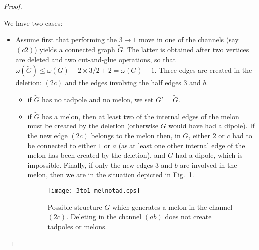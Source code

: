 \documentclass[10pt]{article}
\theoremstyle{plain}
\theoremstyle{definition}
\begin{document}
\begin{proof}
\begin{description}
We have two cases:
\begin{itemize}
\item Assume first that performing the $3\to 1$ move in one of the channels (say $(c2)$) yields a connected graph $\tilde{G}$. The latter is obtained after two vertices are deleted and two cut-and-glue operations,
so that $\omega(\tilde{G}) \leq \omega(G) - 2\times 3/2 + 2 = \omega(G) - 1$. Three edges are created in the deletion: $(2c)$ and the edges involving the half edges $3$ and $b$.
\begin{itemize}
\item if $\tilde{G}$ has no tadpole and no melon, we set $G' = \tilde{G}$.
\item if $\tilde{G}$ has a melon, then at least two of the internal edges of the melon must be created by the deletion (otherwise $G$ would have had a dipole). If the new edge $(2c)$ belongs to the melon then, in $G$,
either $2$ or $c$ had to be connected to either $1$ or $a$ (as at least one other internal edge of the melon has been created by the deletion),  and $G$ had a dipole, which is impossible.
Finally, if only the new edges $3$ and $b$ are involved in the melon, then we are in the situation depicted in Fig.~\ref{fig:melcreated}.
\begin{figure}[htb]
 \begin{center}
 \texttt{[image: 3to1-melnotad.eps]}  
 \caption{Possible structure $G$ which generates a melon in the channel $(2c)$. Deleting in the channel $(ab)$ does not create tadpoles or melons.} \label{fig:melcreated}
 \end{center}
 \end{figure}


\end{itemize}
\end{itemize}
\end{description}
\end{proof}
\end{document}
